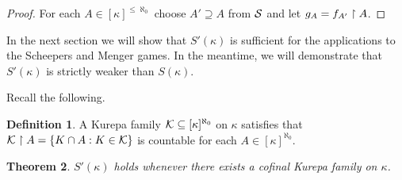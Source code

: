 \documentclass{amsart}
\theoremstyle{plain}
\newtheorem{theorem}{Theorem}
\theoremstyle{definition}
\newtheorem{definition}[theorem]{Definition}
\theoremstyle{remark}
\theoremstyle{plain}
\theoremstyle{definition}
\theoremstyle{remark}
\begin{document}
  \begin{proof}
    For each \(A\in[\kappa]^{\leq\aleph_0}\) choose \(A'\supseteq A\)
    from \(\mathcal{S}\) and let \(g_A=f_{A'}\restriction A\).
  \end{proof}

  In the next section we will show that \(S'(\kappa)\) is sufficient
  for the applications to the Scheepers and Menger games.
  In the meantime, we will demonstrate that \(S'(\kappa)\) is strictly
  weaker than \(S(\kappa)\).

  Recall the following.

  \begin{definition}
    A Kurepa family \(\mathcal{K}\subseteq[\kappa]^{\aleph_0}\) on \(\kappa\)
    satisfies that
    \(\mathcal{K}\restriction A=\{K\cap A:K\in\mathcal{K}\}\) is countable
    for each \(A\in[\kappa]^{\aleph_0}\).
  \end{definition}

  \begin{theorem}
    \(S'(\kappa)\) holds whenever there exists a cofinal Kurepa family on \(\kappa\).
  \end{theorem}
\end{document}
